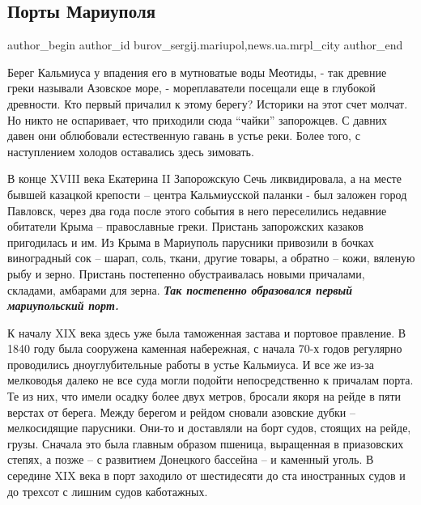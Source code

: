  
 
 
 
 
 
\subsection{Порты Мариуполя}
\label{sec:26_05_2018.stz.news.ua.mrpl_city.1.porty_mariupolja}
 
\ifcmt
 author_begin
   author_id burov_sergij.mariupol,news.ua.mrpl_city
 author_end
\fi

Берег Кальмиуса у впадения его в мутноватые воды Меотиды, - так древние греки
называли Азовское море, - мореплаватели посещали еще в глубокой древности. Кто
первый причалил к этому берегу? Историки на этот счет молчат. Но никто не
оспаривает, что приходили сюда \enquote{чайки} запорожцев. С давних давен они
облюбовали естественную гавань в устье реки. Более того, с наступлением холодов
оставались здесь зимовать.

В конце XVIII века Екатерина II Запорожскую Сечь ликвидировала, а на месте
бывшей казацкой крепости – центра Кальмиусской паланки - был заложен город
Павловск, через два года после этого события в него переселились недавние
обитатели Крыма – православные греки. Пристань запорожских казаков пригодилась
и им. Из Крыма в Мариуполь парусники привозили в бочках виноградный сок –
шарап, соль, ткани, другие товары, а обратно – кожи, вяленую рыбу и зерно.
Пристань постепенно обустраивалась новыми причалами, складами, амбарами для
зерна. \textbf{\em Так постепенно образовался первый мариупольский порт.} 

К началу XIX века здесь уже была таможенная застава и портовое правление. В
1840 году была сооружена каменная набережная, с начала 70-х годов регулярно
проводились дноуглубительные работы в устье Кальмиуса. И все же из-за
мелководья далеко не все суда могли подойти непосредственно к причалам порта.
Те из них, что имели осадку более двух метров, бросали якоря на рейде в пяти
верстах от берега. Между берегом и рейдом сновали азовские дубки – мелкосидящие
парусники. Они-то и доставляли на борт судов, стоящих на рейде, грузы. Сначала
это была главным образом пшеница, выращенная в приазовских степях, а позже – с
развитием Донецкого бассейна – и каменный уголь. В середине XIX века в порт
заходило от шестидесяти до ста иностранных судов и до трехсот с лишним судов
каботажных.

